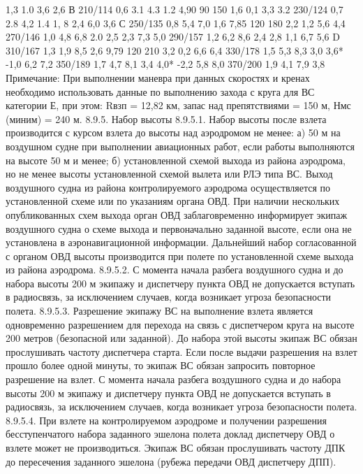 										
										
										
		1,3	1.0	3,6	2,6					
В	210/114	0,6	3.1	4.3	1.2	4,90	90	150		
		1,6	0,1	3,3	3.2					
	230/124	0,7	2.8	4,2	1.4					
		1, 8	2,4	6,0	3,6					
С	250/135	0,8	5,4	7,0	1,6	7,85	120	180		
		2,2	1,2	5,6	4,4					
	270/146	1,0	4,8	6,8	2.0					
		2,5	2,3	7,3	5,0					
	290/157	1,2	6,2	8,6	2,4					
		2,8	1,1	6,7	5,6					
D	310/167	1,3	1,9	8,5	2,6	9,79	120	210		
		3,2	0,2	6,6	6,4					
	330/178	1,5	5,3	8,3	3,0					
		3,6*	-1,0	6,2	7,2					
	350/189	1,7	4,7	8,1	3,4					
		4,0*	-2,2	5,8	8,0					
	370/200	1,9	4,1	7,9	3,8					
Примечание: При выполнении маневра при данных скоростях и кренах необходимо использовать данные по выполнению захода с круга для ВС категории Е, при этом:
Rвзп = 12,82 км, запас над препятствиями = 150 м, Нмс (миним) = 240 м.
8.9.5.  Набор высоты
8.9.5.1. Набор высоты после взлета производится с курсом взлета до высоты над аэродромом не менее: 
а)	50 м на воздушном судне при выполнении авиационных работ, если работы выполняются на высоте 50 м и менее; 
б)	установленной схемой выхода из района аэродрома, но не менее высоты установленной схемой вылета или РЛЭ типа ВС.
Выход воздушного судна из района контролируемого аэродрома осуществляется по установленной схеме или по указаниям органа ОВД. 
При наличии нескольких опубликованных схем выхода орган ОВД заблаговременно информирует экипаж воздушного судна о схеме выхода и первоначально заданной высоте, если она не установлена в аэронавигационной информации.
Дальнейший набор согласованной с органом ОВД высоты производится при полете по установленной схеме выхода из района аэродрома.
8.9.5.2. С момента начала разбега воздушного судна и до набора высоты 200 м экипажу и диспетчеру пункта ОВД не допускается вступать в радиосвязь, за исключением случаев, когда возникает угроза безопасности полета.
8.9.5.3. Разрешение экипажу ВС на выполнение взлета является одновременно разрешением для перехода на связь с диспетчером круга на высоте 200 метров (безопасной или заданной). До набора этой высоты экипаж ВС обязан прослушивать частоту диспетчера старта. Если после выдачи разрешения на взлет прошло более одной минуты, то экипаж ВС обязан запросить повторное разрешение на взлет. 
С момента начала разбега воздушного судна и до набора высоты 200 м экипажу и диспетчеру пункта ОВД не допускается вступать в радиосвязь, за исключением случаев, когда возникает угроза безопасности полета.
8.9.5.4. При взлете на контролируемом аэродроме и получении разрешения бесступенчатого набора заданного эшелона полета доклад диспетчеру ОВД о взлете может не производиться. Экипаж ВС обязан прослушивать частоту ДПК до пересечения заданного эшелона (рубежа передачи ОВД диспетчеру ДПП).
